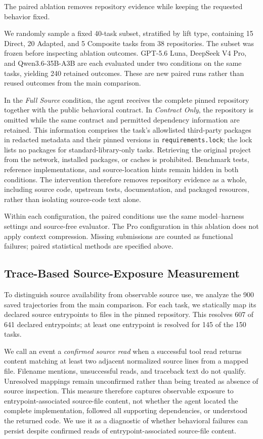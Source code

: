 \documentclass[acmsmall,screen,review,anonymous]{acmart}
\begin{document}
The paired ablation removes repository evidence while keeping the requested
behavior fixed.

We randomly sample a fixed 40-task subset, stratified by lift type, containing
15 Direct, 20 Adapted, and 5 Composite tasks from 38 repositories.
The subset was frozen before inspecting ablation outcomes. GPT-5.6 Luna,
DeepSeek V4 Pro, and Qwen3.6-35B-A3B are each evaluated under two conditions
on the same tasks, yielding 240 retained outcomes. These are new paired runs
rather than reused outcomes from the main comparison.

In the \emph{Full Source} condition, the agent receives the complete pinned
repository together with the public behavioral contract. In \emph{Contract
Only}, the repository is omitted while the same contract and permitted
dependency information are retained. This information comprises the task's
allowlisted third-party packages in redacted metadata and their pinned versions
in \texttt{requirements.lock}; the lock lists no packages for standard-library-only
tasks. Retrieving the original project from the
network, installed packages, or caches is prohibited. Benchmark tests, reference
implementations, and source-location hints remain hidden in both conditions. The
intervention therefore removes repository evidence as a whole, including source
code, upstream tests, documentation, and packaged resources, rather than
isolating source-code text alone.

Within each configuration, the paired conditions use the same model--harness
settings and source-free evaluator. The Pro configuration in this ablation does
not apply context compression. Missing submissions are counted as functional
failures; paired statistical methods are specified above.

\subsection{Trace-Based Source-Exposure Measurement}
\label{sec:source-exposure-protocol}

To distinguish source availability from observable source use, we analyze the
900 saved trajectories from the main comparison. For
each task, we statically map its declared source entrypoints to files in the
pinned repository. This resolves 607 of 641 declared entrypoints; at least one
entrypoint is resolved for 145 of the 150 tasks.

We call an event a \emph{confirmed source read} when a successful tool read
returns content matching at least two adjacent normalized source lines from a
mapped file. Filename mentions, unsuccessful reads, and traceback text do not
qualify. Unresolved mappings remain unconfirmed rather than being treated as
absence of source inspection. This measure therefore captures observable
exposure to entrypoint-associated source-file content, not whether the agent
located the complete implementation, followed all supporting dependencies, or
understood the returned code. We use it as a diagnostic of whether behavioral
failures can persist despite confirmed reads of entrypoint-associated
source-file content.
\end{document}
